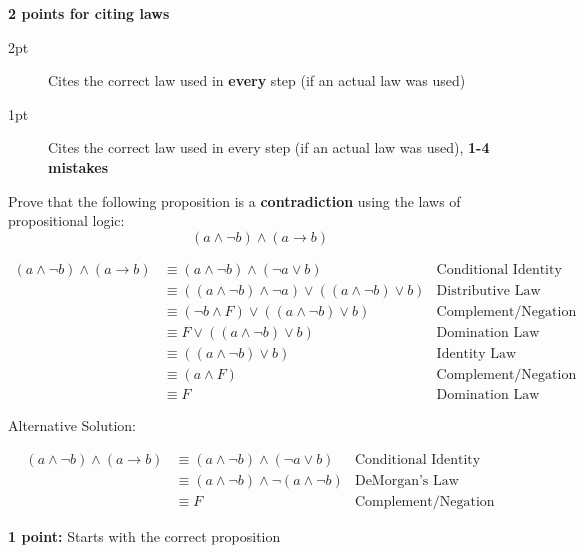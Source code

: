 \documentclass[homework, problems]{../../latex-common/cs151-common}
\begin{document}
\begin{enumeratequestions}
\begin{rubric}
        \textbf{2 points for citing laws}
        \begin{description}
            \item[2pt] Cites the correct law used in \textbf{every} step (if an actual law was used)
            \item[1pt] Cites the correct law used in every step (if an actual law was used), \textbf{1-4 mistakes}
        \end{description}
    \end{rubric}

    \solutionnewpage
    \item Prove that the following proposition is a \textbf{contradiction} using the laws of propositional logic:
    $$(a \wedge \neg b) \wedge (a\rightarrow b)$$
    \begin{solution}
    \begin{align*}
    (a \wedge \neg b) \wedge (a\rightarrow b) &\equiv (a \wedge \neg b) \wedge (\neg a \vee b) & \text{Conditional Identity} \\
    &\equiv ((a \wedge \neg b) \wedge \neg a) \vee ((a \wedge \neg b) \vee b) & \text{Distributive Law} \\
    &\equiv (\neg b \wedge F) \vee ((a \wedge \neg b) \vee b) & \text{Complement/Negation (+ Comm. + Assoc.)} \\
    &\equiv F \vee ((a \wedge \neg b) \vee b) & \text{Domination Law} \\
    &\equiv ((a \wedge \neg b) \vee b) & \text{Identity Law} \\
    &\equiv (a \wedge F) & \text{Complement/Negation (+ Associative)} \\
    &\equiv F & \text{Domination Law}
    \end{align*}

    Alternative Solution:

    \begin{align*}
    (a \wedge \neg b) \wedge (a\rightarrow b) &\equiv (a \wedge \neg b) \wedge (\neg a \vee b) & \text{Conditional Identity} \\
    &\equiv (a \wedge \neg b) \wedge \neg(a \wedge \neg b) & \text{DeMorgan's Law} \\
    &\equiv F & \text{Complement/Negation}
    \end{align*}
    \end{solution}

    \begin{rubric}
        \textbf{1 point:} Starts with the correct proposition


\end{rubric}
\end{enumeratequestions}
\end{document}
